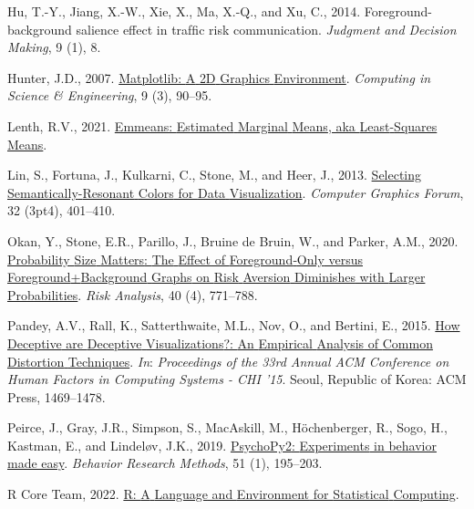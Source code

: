 \documentclass[
]{interact}
\newlength{\cslhangindent}
\newlength{\cslentryspacingunit} %
\newenvironment{CSLReferences}[2] %
 {%
  \setlength{\parindent}{0pt}
  \ifodd #1
  \let\oldpar\par
  \def\par{\hangindent=\cslhangindent\oldpar}
  \fi
  \setlength{\parskip}{#2\cslentryspacingunit}
 }%
 {}
\begin{document}
\begin{CSLReferences}{1}{0}
\leavevmode{}%
Hu, T.-Y., Jiang, X.-W., Xie, X., Ma, X.-Q., and Xu, C., 2014.
Foreground-background salience effect in trafﬁc risk communication.
\emph{Judgment and Decision Making}, 9 (1), 8.

\leavevmode{}%
Hunter, J.D., 2007.
\href{https://doi.org/10.1109/MCSE.2007.55}{Matplotlib: {A} {2D}
{Graphics} {Environment}}. \emph{Computing in Science \& Engineering}, 9
(3), 90--95.

\leavevmode{}%
Lenth, R.V., 2021.
\href{https://CRAN.R-project.org/package=emmeans}{Emmeans: {Estimated}
{Marginal} {Means}, aka {Least}-{Squares} {Means}}.

\leavevmode{}%
Lin, S., Fortuna, J., Kulkarni, C., Stone, M., and Heer, J., 2013.
\href{https://doi.org/10.1111/cgf.12127}{Selecting
{Semantically}-{Resonant} {Colors} for {Data} {Visualization}}.
\emph{Computer Graphics Forum}, 32 (3pt4), 401--410.

\leavevmode{}%
Okan, Y., Stone, E.R., Parillo, J., Bruine de Bruin, W., and Parker,
A.M., 2020. \href{https://doi.org/10.1111/risa.13431}{Probability {Size}
{Matters}: {The} {Effect} of {Foreground}‐{Only} versus
{Foreground}+{Background} {Graphs} on {Risk} {Aversion} {Diminishes}
with {Larger} {Probabilities}}. \emph{Risk Analysis}, 40 (4), 771--788.

\leavevmode{}%
Pandey, A.V., Rall, K., Satterthwaite, M.L., Nov, O., and Bertini, E.,
2015. \href{https://doi.org/10.1145/2702123.2702608}{How {Deceptive} are
{Deceptive} {Visualizations}?: {An} {Empirical} {Analysis} of {Common}
{Distortion} {Techniques}}. \emph{In}: \emph{Proceedings of the 33rd
{Annual} {ACM} {Conference} on {Human} {Factors} in {Computing}
{Systems} - {CHI} '15}. Seoul, Republic of Korea: ACM Press, 1469--1478.

\leavevmode{}%
Peirce, J., Gray, J.R., Simpson, S., MacAskill, M., Höchenberger, R.,
Sogo, H., Kastman, E., and Lindeløv, J.K., 2019.
\href{https://doi.org/10.3758/s13428-018-01193-y}{{PsychoPy2}:
{Experiments} in behavior made easy}. \emph{Behavior Research Methods},
51 (1), 195--203.

\leavevmode{}%
R Core Team, 2022. \href{https://www.R-project.org/}{R: {A} {Language}
and {Environment} for {Statistical} {Computing}}.


\end{CSLReferences}
\end{document}

